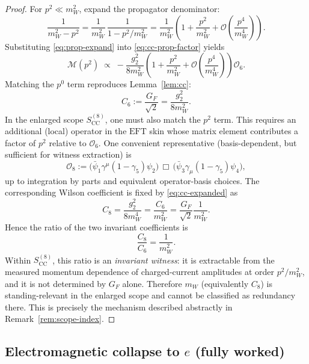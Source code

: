 \documentclass[11pt]{article}
\theoremstyle{remark}
\newcommand{\EFT}{\ensuremath{\mathrm{EFT}}}
\newcommand{\CC}{\ensuremath{\mathrm{CC}}}
\newcommand{\cO}{\mathcal{O}}
\begin{document}
\begin{proof}
For $p^2\ll m_W^2$, expand the propagator denominator:
\begin{equation}\label{eq:prop-expand}
\frac{1}{m_W^2-p^2}
=
\frac{1}{m_W^2}\,\frac{1}{1-p^2/m_W^2}
=
\frac{1}{m_W^2}\left(1+\frac{p^2}{m_W^2}+\cO\!\left(\frac{p^4}{m_W^4}\right)\right).
\end{equation}
Substituting \eqref{eq:prop-expand} into \eqref{eq:cc-prop-factor} yields
\begin{equation}\label{eq:cc-expanded}
\mathcal{M}(p^2)\;\propto\;
-\frac{g_2^2}{8m_W^2}\left(1+\frac{p^2}{m_W^2}+\cO\!\left(\frac{p^4}{m_W^4}\right)\right)\mathcal{O}_6.
\end{equation}
Matching the $p^0$ term reproduces Lemma~\ref{lem:cc}:
\begin{equation}\label{eq:C6def}
C_6 := \frac{G_F}{\sqrt2}=\frac{g_2^2}{8m_W^2}.
\end{equation}
In the enlarged scope $S_{\CC}^{(8)}$, one must also match the $p^2$ term. This requires an additional
(local) operator in the $\EFT$ skin whose matrix element contributes a factor of $p^2$ relative to
$\mathcal{O}_6$. One convenient representative (basis-dependent, but sufficient for witness extraction) is
\begin{equation}\label{eq:O8}
\mathcal{O}_8 :=
\big(\bar\psi_1\gamma^\mu(1-\gamma_5)\psi_2\big)\,\Box\,
\big(\bar\psi_3\gamma_\mu(1-\gamma_5)\psi_4\big),
\end{equation}
up to integration by parts and equivalent operator-basis choices.
The corresponding Wilson coefficient is fixed by \eqref{eq:cc-expanded} as
\begin{equation}\label{eq:C8def}
C_8 = \frac{g_2^2}{8m_W^4}=\frac{C_6}{m_W^2}=\frac{G_F}{\sqrt2}\frac{1}{m_W^2}.
\end{equation}
Hence the ratio of the two invariant coefficients is
\begin{equation}\label{eq:ratio}
\frac{C_8}{C_6}=\frac{1}{m_W^2}.
\end{equation}
Within $S_{\CC}^{(8)}$, this ratio is an \emph{invariant witness}: it is extractable from the measured
momentum dependence of charged-current amplitudes at order $p^2/m_W^2$, and it is not determined by
$G_F$ alone. Therefore $m_W$ (equivalently $C_8$) is standing-relevant in the enlarged scope and cannot be
classified as redundancy there. This is precisely the mechanism described abstractly in
Remark~\ref{rem:scope-index}.
\end{proof}




\subsection{Electromagnetic collapse to $e$ (fully worked)}
\end{document}
